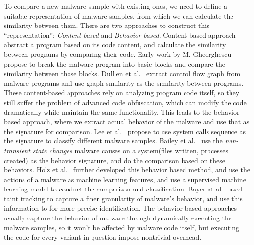 To compare a new malware sample with existing ones, we need to define a 
suitable representation of malware samples, from which we can calculate 
the similarity between them. There are two approaches to construct this 
``representation'': \textit{Content-based} and \textit{Behavior-based}. 
Content-based approach abstract a program based on its code content, and 
calculate the similarity between programs by comparing their code. 
Early work by M. Gheorghescu~\cite{Gheorghescu2006ANAV} propose 
to break the malware program into basic blocks and compare the similarity 
between those blocks.
Dullien et al.~\cite{dullien2005graph} extract control flow graph from 
malware programs and use graph similarity as the similarity between programs.
These content-based approaches rely on analyzing program code itself, so 
they still suffer the problem of advanced code obfuscation, which can modify
the code dramatically while maintain the same functionality. This leads to
the behavior-
based approach, where we extract actual behavior of the malware and use that
as the signature for comparison. Lee et al.~\cite{lee2006behavioral} propose
to use system calls sequence as the signature to classify different malware
samples. Bailey et al.~\cite{bailey2007automated} use the \textit{non-transient
state changes} malware causes on a system(files written, processes created) as 
the behavior signature, and do the comparison based on these behaviors. Holz 
et al.~\cite{rieck2008learning} further developed this behavior based method, 
and use the actions of a malware as machine learning features, and use a 
supervised machine learning model to conduct the comparison and classification.
Bayer at al.~\cite{bayer2009scalable} used taint tracking to capture a finer
granularity of malware's behavior, and use this information to for more precise
identification. The behavior-based approaches usually capture the behavior of
malware through dynamically executing the malware samples, so it won't be 
affected by malware code itself, but executing the code for every variant in
question impose nontrivial overhead. 

